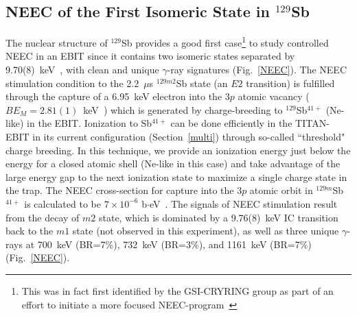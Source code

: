 \documentclass[12pt]{article}
\begin{document}
\subsection{\label{129SbCase}NEEC of the First Isomeric State in $^{129}$Sb}
The nuclear structure of $^{129}$Sb provides a good first case\footnote{This was in fact first identified by the GSI-CRYRING group as part of an effort to initiate a more focused NEEC-program~\cite{Let16}} to study controlled NEEC in an EBIT since it contains two isomeric states separated by 9.70(8)~keV~\cite{NNDC}, with clean and unique $\gamma$-ray signatures (Fig.~\ref{NEEC}).  The NEEC stimulation condition to the 2.2~$\mu$s $^{129m2}$Sb state (an $E2$ transition) is fulfilled through the capture of a 6.95~keV electron into the $3p$ atomic vacancy ($BE_M=2.81(1)$~keV~\cite{PalPC}) which is generated by charge-breeding to $^{129}$Sb$^{41+}$ (Ne-like) in the EBIT.  Ionization to Sb$^{41+}$ can be done efficiently in the TITAN-EBIT in its current configuration (Section~\ref{multi}) through so-called ``threshold" charge breeding.  In this technique, we provide an ionization energy just below the energy for a closed atomic shell (Ne-like in this case) and take advantage of the large energy gap to the next ionization state to maximize a single charge state in the trap.  The NEEC cross-section for capture into the $3p$ atomic orbit in $^{129m}$Sb$^{41+}$ is calculated to be $7\times10^{-6}$ b$\cdot$eV~\cite{PalPC}.  The signals of NEEC stimulation result from the decay of $m2$ state, which is dominated by a 9.76(8)~keV IC transition back to the $m1$ state (not observed in this experiment), as well as three unique $\gamma$-rays at 700~keV (BR=7\%), 732~keV (BR=3\%), and 1161~keV (BR=7\%) (Fig.~\ref{NEEC}).
\end{document}
